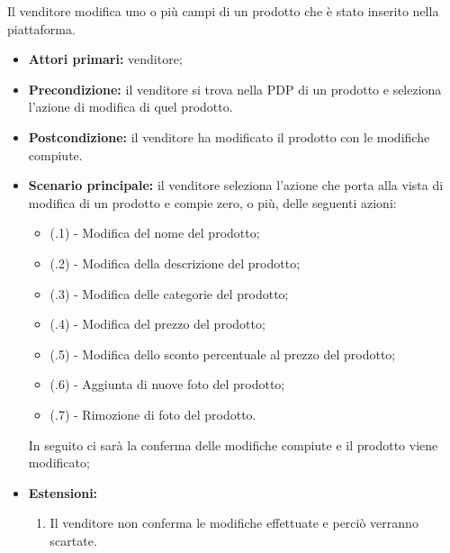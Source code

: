 Il venditore modifica uno o più campi di un prodotto che è stato inserito nella piattaforma.
\begin{itemize}
    \item \textbf{Attori primari:} venditore;
    \item \textbf{Precondizione:} il venditore si trova nella PDP di un prodotto e seleziona l'azione di modifica di quel prodotto.
    \item \textbf{Postcondizione:} il venditore ha modificato il prodotto con le modifiche compiute.
    \item \textbf{Scenario principale:} il venditore seleziona l'azione che porta alla vista di modifica di un prodotto e compie zero, o più, delle seguenti azioni:
    \begin{itemize}
        \item (\actualUC.1) - Modifica del nome del prodotto;
        \item (\actualUC.2) - Modifica della descrizione del prodotto;
        \item (\actualUC.3) - Modifica delle categorie del prodotto;
        \item (\actualUC.4) - Modifica del prezzo del prodotto;
        \item (\actualUC.5) - Modifica dello sconto percentuale al prezzo del prodotto;
        \item (\actualUC.6) - Aggiunta di nuove foto del prodotto;
        \item (\actualUC.7) - Rimozione di foto del prodotto.
    \end{itemize}
    In seguito ci sarà la conferma delle modifiche compiute e il prodotto viene modificato;
    \item \textbf{Estensioni:}
    \begin{enumerate}
    	\item Il venditore non conferma le modifiche effettuate e perciò verranno scartate.
    \end{enumerate}
\end{itemize}

